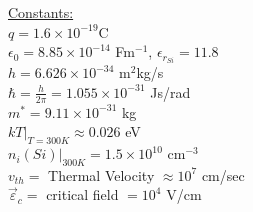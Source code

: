 \documentclass[12pt]{article}
\begin{document}
\begin{small}
\begin{multicols*}{2}
			\noindent\underline{Constants:}\\
			$q = 1.6\times10^{-19}$C\\
			$\epsilon_0 = 8.85\times10^{-14}$ Fm$^{-1}$,  $\epsilon_{r_{Si}} = 11.8$\\
			$h = 6.626 \times 10^{-34}$ m$^2$kg/s\\
			$\hbar = \frac{h}{2\pi} = 1.055 \times 10^{-31} $ Js/rad\\ 
			$m^* = 9.11 \times 10^{-31}$ kg\\
			$kT|_{T=300K} \approx 0.026$ eV \\
			$n_i(Si)|_{300K} = 1.5 \times 10^{10}$ cm$^{-3}$\\
			$v_{th} =$ Thermal Velocity $\approx 10^7$ cm/sec \\
			$\vec{\varepsilon}_c =$ critical field $= 10^4$ V/cm\\\\
		\end{multicols*}
	

		\pagebreak
		

\end{small}
\end{document}
